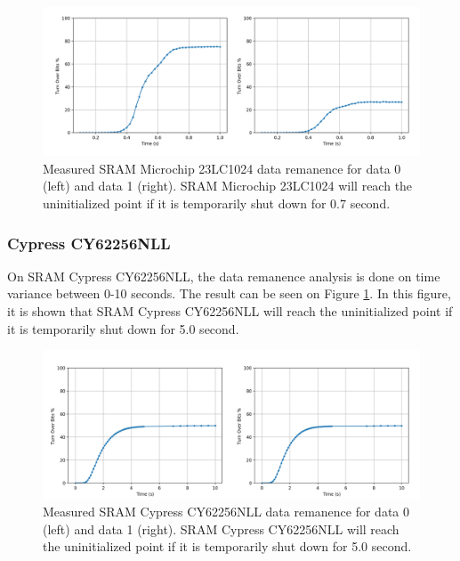 \begin{figure}[tph!]
    \centerline{\includegraphics[width={\textwidth}]{images/remanence_23lc1024}}
    \caption{Measured SRAM Microchip 23LC1024 data remanence for data 0 (left) and data 1 (right).
    SRAM Microchip 23LC1024 will reach the uninitialized point if it is temporarily shut down for 0.7 second.}
    \label{fig:23lc1024-remanence0}
\end{figure}



\subsubsection{Cypress CY62256NLL}

On SRAM Cypress CY62256NLL, the data remanence analysis is done on time variance between 0-10 seconds. The result can be seen on Figure \ref{fig:23lc1024-remanence0}. In this figure, it is shown that
SRAM Cypress CY62256NLL will reach the uninitialized point if it is temporarily shut down for 5.0 second.

\begin{figure}[tph!]
    \centerline{\includegraphics[width={\textwidth}]{images/remanence_cy62256nll}}
    \caption{Measured SRAM Cypress CY62256NLL data remanence for data 0 (left) and data 1 (right).
    SRAM Cypress CY62256NLL will reach the uninitialized point if it is temporarily shut down for 5.0 second.}
    \label{fig:CY62256NLL-remanence0}
\end{figure}


